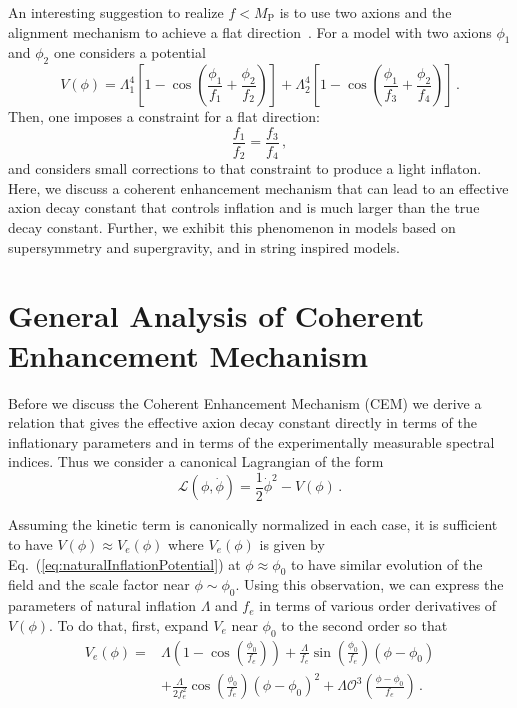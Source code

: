 \documentclass[12pt]{article}
\begin{document}
An interesting suggestion to realize $f < M_\text{P}$ is to use two axions and the alignment mechanism to achieve a flat direction~\cite{Long:2014dta}.
For a model with two axions $\phi_1$ and $\phi_2$ one considers a potential
\begin{equation} \label{eq:alignmentPotential}
  V(\phi)
    = \Lambda^4_1 \left[1 - \cos\left(\frac{\phi_1}{f_1} + \frac{\phi_2}{f_2}\right)\right]
    + \Lambda^4_2 \left[1 - \cos\left(\frac{\phi_1}{f_3} + \frac{\phi_2}{f_4}\right)\right]\,.
\end{equation}
Then, one imposes a constraint for a flat direction:
\begin{equation} \label{eq:alignmentConstraint}
  \frac{f_1}{f_2} = \frac{f_3}{f_4}\,,
\end{equation}
and considers small corrections to that constraint to produce a light inflaton.
Here, we discuss a coherent enhancement mechanism that can lead to an effective axion decay constant that controls inflation and is much larger than the true decay constant.
Further, we exhibit this phenomenon in models based on supersymmetry and supergravity, and in string inspired models.

\section{General Analysis of Coherent Enhancement Mechanism \label{sec:CoherentEnhancement}}
Before we discuss the Coherent Enhancement Mechanism (CEM) we derive a relation that gives the effective axion decay constant directly in terms of the inflationary parameters and in terms of the experimentally measurable spectral indices.
Thus we consider a canonical Lagrangian of the form
\begin{equation}
  \mathcal{L}\left(\phi, \dot{\phi}\right) = \frac{1}{2}{\dot{\phi}}^2 - V\left(\phi\right)\,.
\end{equation}

Assuming the kinetic term is canonically normalized in each case, it is sufficient to have $V\left(\phi\right) \approx V_{e}\left(\phi\right)$ where $V_{e}\left(\phi\right)$ is given by Eq.~(\ref{eq:naturalInflationPotential}) at $\phi \approx \phi_0$ to have similar evolution of the field and the scale factor near $\phi \sim \phi_0$.
Using this observation, we can express the parameters of natural inflation $\Lambda$ and $f_e$ in terms of various order derivatives of $V\left(\phi\right)$.
To do that, first, expand $V_{e}$ near $\phi_0$ to the second order so that
\begin{equation} \label{eq:naturalInflationSeries}
  \begin{aligned}
    V_{e}\left(\phi\right) =
      &\Lambda \left(1 - \cos\left(\frac{\phi_0}{f_e}\right)\right)
        + \frac{\Lambda}{f_e} \sin\left(\frac{\phi_0}{f_e}\right) \left(\phi - \phi_0\right)\\
      & + \frac{\Lambda}{2 f_e^2} \cos\left(\frac{\phi_0}{f_e}\right) \left(\phi - \phi_0\right)^2
        + \Lambda \mathcal{O}^3\left(\frac{\phi - \phi_0}{f_e}\right)\,.
  \end{aligned}
\end{equation}
\end{document}
